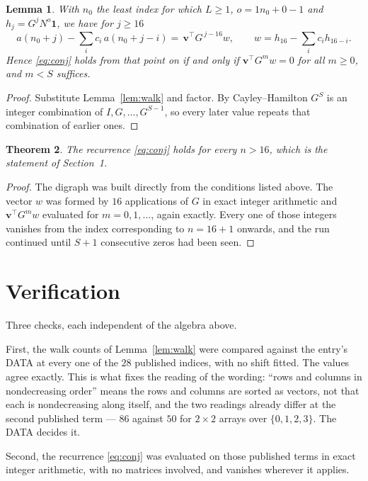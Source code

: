 \documentclass[11pt,a4paper]{article}
\theoremstyle{plain}
\newtheorem{theorem}{Theorem}
\newtheorem{lemma}[theorem]{Lemma}
\theoremstyle{definition}
\begin{document}
\begin{lemma}\label{lem:crit}
With $n_0$ the least index for which $L\ge1$, $o=1n_0+0-1$ and
$h_j=G^{j}N^{o}\mathbf{1}$, we have for $j\ge16$
\[
a(n_0+j)-\sum_i c_i\,a(n_0+j-i)=\,\mathbf{v}^{\!\top}G^{\,j-16}w,
\qquad w=h_{16}-\sum_i c_ih_{16-i} .
\]
Hence \eqref{eq:conj} holds from that point on if and only if
$\mathbf{v}^{\!\top}G^{m}w=0$ for all $m\ge0$, and $m<S$ suffices.
\end{lemma}

\begin{proof}
Substitute Lemma~\ref{lem:walk} and factor. By Cayley--Hamilton $G^{S}$ is an integer
combination of $I,G,\dots,G^{S-1}$, so every later value repeats that combination of
earlier ones.
\end{proof}

\begin{theorem}
The recurrence \eqref{eq:conj} holds for every $n>16$, which is the statement of
Section~1.
\end{theorem}

\begin{proof}
The digraph was built directly from the conditions listed above. The vector $w$ was formed by
$16$ applications of $G$ in exact integer arithmetic and $\mathbf{v}^{\!\top}G^{m}w$
evaluated for $m=0,1,\dots$, again exactly. Every one of those integers vanishes from the
index corresponding to $n=16+1$ onwards, and the run continued until $S+1$ consecutive
zeros had been seen.
\end{proof}

\section{Verification}

Three checks, each independent of the algebra above.

First, the walk counts of Lemma~\ref{lem:walk} were compared against the entry's DATA at
every one of the $28$ published indices, with no shift fitted. The values agree exactly.
This is what fixes the reading of the wording: ``rows and columns in nondecreasing order''
means the rows and columns are sorted as vectors, not that each is nondecreasing along
itself, and the two readings already differ at the second published term --- $86$ against
$50$ for $2\times2$ arrays over $\{0,1,2,3\}$. The DATA decides it.

Second, the recurrence \eqref{eq:conj} was evaluated on those published terms in exact
integer arithmetic, with no matrices involved, and vanishes wherever it applies.
\end{document}

